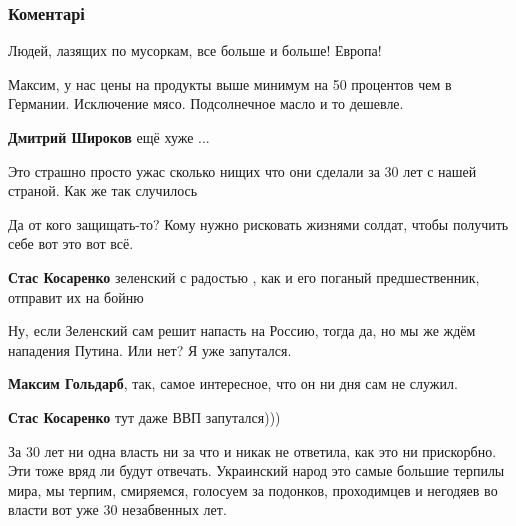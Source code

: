  
 
 
 
 
\subsubsection{Коментарі}
\label{sec:23_11_2021.fb.goldarb_maksim.1.menjshe_220_evro.cmt}

\begin{itemize} %
Людей, лазящих по мусоркам, все больше и больше! Европа!

Максим, у нас цены на продукты выше минимум на 50 процентов чем в Германии. Исключение мясо. Подсолнечное масло и то дешевле.

\textbf{Дмитрий Широков} ещё хуже ...

Это страшно просто ужас сколько нищих что они сделали за 30 лет с нашей страной. Как же так случилось


Да от кого защищать-то? Кому нужно рисковать жизнями солдат, чтобы получить
себе вот это вот всё.

\begin{itemize} %
\textbf{Стас Косаренко} зеленский с радостью , как и его поганый предшественник, отправит их на бойню

Ну, если Зеленский сам решит напасть на Россию, тогда да, но мы же ждём нападения Путина. Или нет? Я уже запутался.

\textbf{Максим Гольдарб}, так, самое интересное, что он ни дня сам не служил.

\textbf{Стас Косаренко} тут даже ВВП запутался)))
\end{itemize} %


За 30 лет ни одна власть ни за что и никак не ответила, как это ни прискорбно.
Эти тоже вряд ли будут отвечать. Украинский народ это самые большие терпилы
мира, мы терпим, смиряемся, голосуем за подонков, проходимцев и негодяев во
власти вот уже 30 незабвенных лет.


\end{itemize}
